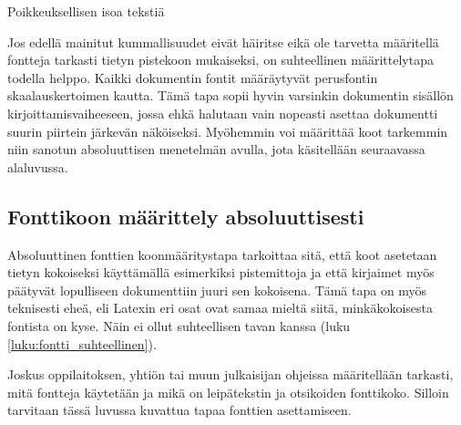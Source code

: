 \begin{koodilohkosis}
{ Poikkeuksellisen isoa tekstiä}
\end{koodilohkosis}

Jos edellä mainitut kummallisuudet eivät häiritse eikä ole tarvetta
määritellä fontteja tarkasti tietyn pistekoon mukaiseksi, on
suhteellinen määrittelytapa todella helppo. Kaikki dokumentin fontit
määräytyvät perusfontin skaalauskertoimen kautta. Tämä tapa sopii hyvin
varsinkin dokumentin sisällön kirjoittamisvaiheeseen, jossa ehkä
halutaan vain nopeasti asettaa dokumentti suurin piirtein järkevän
näköiseksi. Myöhemmin voi määrittää koot tarkemmin niin sanotun
absoluuttisen menetelmän avulla, jota käsitellään seuraavassa
alaluvussa.

\subsection{Fonttikoon määrittely absoluuttisesti}
\label{luku:fontti_absoluuttinen}

Absoluuttinen fonttien koonmääritystapa tarkoittaa sitä, että koot
asetetaan tietyn kokoiseksi käyttämällä esimerkiksi pistemittoja ja että
kirjaimet myös päätyvät lopulliseen dokumenttiin juuri sen kokoisena.
Tämä tapa on myös teknisesti eheä, eli Latexin eri osat ovat samaa
mieltä siitä, minkäkokoisesta fontista on kyse. Näin ei ollut
suhteellisen tavan kanssa (luku \ref{luku:fontti_suhteellinen}).

Joskus oppilaitoksen, yhtiön tai muun julkaisijan ohjeissa määritellään
tarkasti, mitä fontteja käytetään ja mikä on leipätekstin ja otsikoiden
fonttikoko. Silloin tarvitaan tässä luvussa kuvattua tapaa fonttien
asettamiseen.

